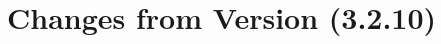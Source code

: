 %
%
%
%
%
%
%
%
%
%
%
%
%
%
%
%

\chapter{Changes from Version (3.2.10)\label{app-changes-from-3.2.10}}

